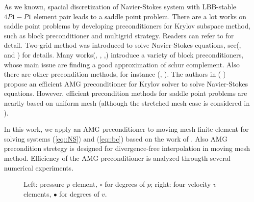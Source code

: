 \documentclass{eajam}
\begin{document}
    As we known, spacial discretization of Navier-Stokes system with
    LBB-stable $4P1-P1$ element pair leads to a saddle point problem.
    There are a lot works on saddle point problems by developing
    preconditioners for Krylov subspace method, such as block
    preconditioner and multigrid strategy. Readers can refer to
    \cite{benzi2005numerical} for detail. Two-grid method was
    introduced to solve Navier-Stokes equations,
    see(\cite{shen1999schur},\cite{xu1992iterative} and
    \cite{he2003two}) for details. Many works(\cite{bai2005inexact},
    \cite{bai2006structured},
    \cite{elman2007least},\cite{elman2009boundary}) introduce a
    variety of block preconditioners, whose main issue are finding a
    good approximation of schur complement. Also there are other
    precondition methods, for instance (\cite{benzi2006augmented},
    \cite{benzi2011relaxed}). The authors in (\cite{boyle2007hsl}
    \cite{boyle2010hsl_mi20}) propose an efficient AMG preconditioner
    for Krylov solver to solve Navier-Stokes equations. However,
    efficient precondition methods for saddle point problems are nearlly
    based on uniform mesh (although the stretched mesh case is considered
    in \cite{benzi2011relaxed}).
    
    In this work, we apply an AMG preconditioner to moving mesh
    finite element for solving systems (\ref{eq::NS}) and
    (\ref{eq::bc}) based on the work of
    \cite{elman2005finite}. Also AMG precondition stretegy is designed
    for divergence-free interpolation in moving mesh
    method. Efficiency of the AMG preconditioner is analyzed througth
    several numerical experiments.

    \begin{figure}
      \centering    
      \caption{Left: pressure $p$ element, $\circ$ for degrees of $p$; 
               right: four velocity $v$ elements, $\bullet$ for degrees
               of $v$.}
      \label{fig::p-v}       
    \end{figure}
      
\end{document}

